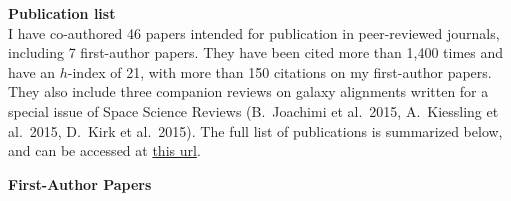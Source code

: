 \documentclass{article}
\begin{document}
% 

\noindent
{\bf\huge Publication list}\\

\noindent
I have co-authored 46 papers intended for publication in peer-reviewed journals, 
including 7 first-author papers. They have been cited more than 1,400 times and 
have an $h$-index of 21, with more than 150 citations on my first-author papers. 
They also include three companion reviews on galaxy alignments written for a 
special issue of Space Science Reviews (B.\ Joachimi et al.\ 2015, A.\ Kiessling 
et al.\ 2015, D.\ Kirk et al.\ 2015). The full list of publications is summarized 
below, and can be accessed at \href{https://goo.gl/LAu9G4}{this url}.

\vspace{0.4cm}
\noindent
{\bf\Large First-Author Papers}\\

\newcommand{\etal}[1]{et al.\ (#1 co-authors),}
\end{document}
